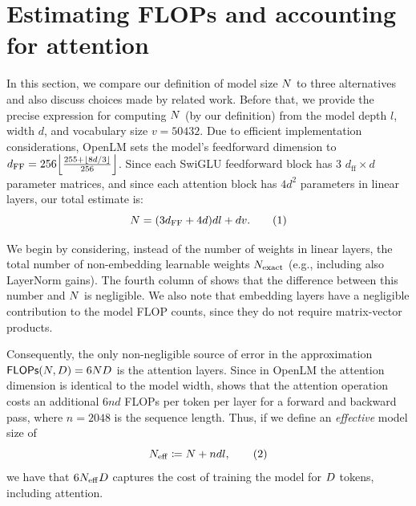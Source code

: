 \documentclass{article}
\theoremstyle{plain}
\theoremstyle{definition}
\theoremstyle{remark}
\DeclarePairedDelimiter{\floor}{\lfloor}{\rfloor}
\newcommand\numberthis{\addtocounter{equation}{1}\tag{\theequation}}
\newcommand{\defeq}{\coloneqq}
\newcommand{\maybeSubscript}[1]{
  \ifthenelse{\equal{#1}{}}{}{_{#1}}%
}
\newcommand{\params}[1][]{N\maybeSubscript{#1}}
\newcommand{\tokens}[1][]{D\maybeSubscript{#1}}
\newcommand{\compute}{\mathsf{FLOPs}}
\newcommand{\paramsEff}{\params_{\mathrm{eff}}}
\newcommand{\paramsExact}{\params_{\mathrm{exact}}}
\begin{document}
\section{Estimating FLOPs and accounting for attention}\label{app:compute-approximate}

In this section, we compare our definition of model size $\params$ to three alternatives and also discuss choices made by related work. Before that, we provide the precise expression for computing $\params$ (by our definition) from the model depth $l$, width $d$, and vocabulary size $v=\num{50432}$. Due to efficient implementation considerations, OpenLM sets the model's feedforward dimension to $d_{\mathrm{FF}}=256 \floor*{\frac{255 + \floor{8d/3}}{256}}$. Since each SwiGLU feedforward block has 3 $d_{\mathrm{ff}} \times d$ parameter matrices, and since each attention block has $4d^2$ parameters in linear layers, our total estimate is:
\[
    \params = (3d_{\mathrm{FF}} + 4d)d l + dv.
    \numberthis
    \label{eq:N-formula}
\]

We begin by considering, instead of the number of weights in linear layers, the total number of non-embedding learnable weights $\paramsExact$ (e.g., including also LayerNorm gains). The fourth column of  shows that the difference between this number and $\params$ is negligible. We also note that embedding layers have a negligible contribution to the model FLOP counts, since they do not require matrix-vector products. 

Consequently, the only non-negligible source of error in the approximation $\compute(\params, \tokens)=6\params\tokens$ is the attention layers. Since in OpenLM the attention dimension is identical to the model width, \citet[Table 1]{kaplan2020scaling} shows that the attention operation costs an additional $6 n d$ FLOPs per token per layer for a forward and backward pass, where $n=2048$ is the sequence length. Thus, if we define an \emph{effective} model size of
\[
\paramsEff \defeq \params + ndl,  
\numberthis  
\label{eq:N-eff-def}
\]
we have that $6\paramsEff \tokens$ captures the cost of training the model for $\tokens$ tokens, including attention. 
\end{document}
